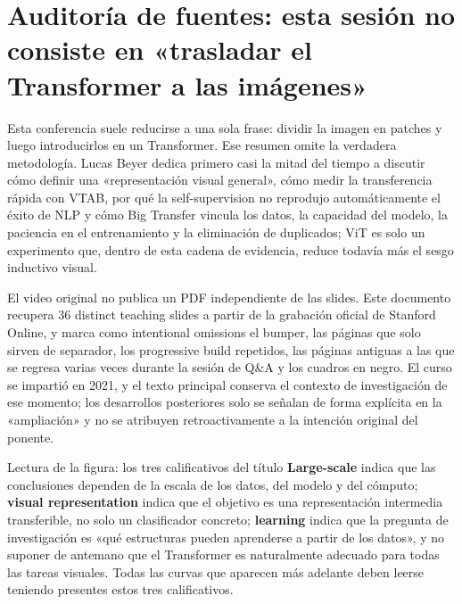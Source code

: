 \section{Auditoría de fuentes: esta sesión no consiste en «trasladar el Transformer a las imágenes»}

Esta conferencia suele reducirse a una sola frase: dividir la imagen en patches y luego introducirlos en un Transformer. Ese resumen omite la verdadera metodología. Lucas Beyer dedica primero casi la mitad del tiempo a discutir cómo definir una «representación visual general», cómo medir la transferencia rápida con VTAB, por qué la self-supervision no reprodujo automáticamente el éxito de NLP y cómo Big Transfer vincula los datos, la capacidad del modelo, la paciencia en el entrenamiento y la eliminación de duplicados; ViT es solo un experimento que, dentro de esta cadena de evidencia, reduce todavía más el sesgo inductivo visual.

El video original no publica un PDF independiente de las slides. Este documento recupera 36 distinct teaching slides a partir de la grabación oficial de Stanford Online, y marca como intentional omissions el bumper, las páginas que solo sirven de separador, los progressive build repetidos, las páginas antiguas a las que se regresa varias veces durante la sesión de Q\&A y los cuadros en negro. El curso se impartió en 2021, y el texto principal conserva el contexto de investigación de ese momento; los desarrollos posteriores solo se señalan de forma explícita en la «ampliación» y no se atribuyen retroactivamente a la intención original del ponente.


\begin{knowledgebox}{Lectura de la figura: los tres calificativos del título}
\textbf{Large-scale} indica que las conclusiones dependen de la escala de los datos, del modelo y del cómputo; \textbf{visual representation} indica que el objetivo es una representación intermedia transferible, no solo un clasificador concreto; \textbf{learning} indica que la pregunta de investigación es «qué estructuras pueden aprenderse a partir de los datos», y no suponer de antemano que el Transformer es naturalmente adecuado para todas las tareas visuales. Todas las curvas que aparecen más adelante deben leerse teniendo presentes estos tres calificativos.
\end{knowledgebox}

